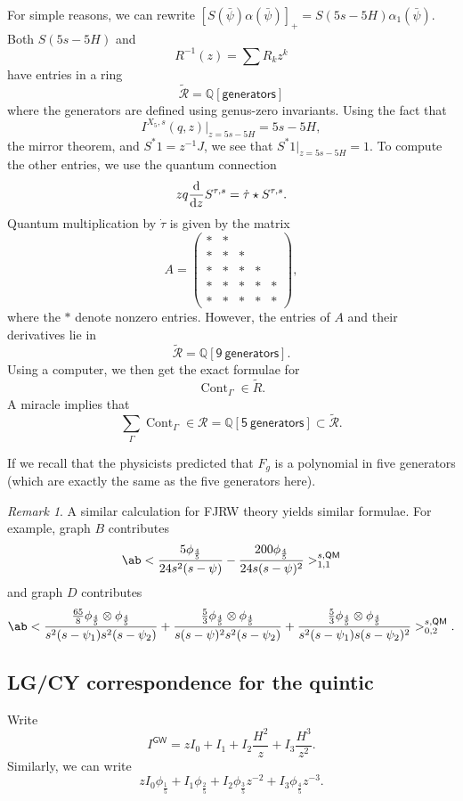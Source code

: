 \documentclass[10pt,oldfontcommands,oneside]{memoir}
\theoremstyle{definition}
\theoremstyle{remark}
\newtheorem{rmk}[thm]{Remark}
\theoremstyle{plain}
\theoremstyle{definition}
\theoremstyle{remark}
\newcommand{\Q}{\mathbb{Q}}
\newcommand{\mc}[1]{\mathcal{#1}}
\newcommand{\ms}[1]{\mathsf{#1}}
\newcommand{\1}{\mathbf{1}}
\newcommand{\2}{\mathbf{2}}
\newcommand{\3}{\mathbf{3}}
\newcommand{\GW}{\ms{GW}}
\newcommand{\QM}{\ms{QM}}
\DeclareMathOperator{\Cont}{Cont}
\begin{document}
For simple reasons, we can rewrite $[S(\bar{\psi})\alpha(\bar{\psi})]_+ = S(5s-5H) \alpha_1(\bar{\psi})$. Both $S(5s-5H)$ and
\[ R^{-1}(z) = \sum R_k z^k \]
have entries in a ring
\[ \tilde{\mc{R}} = \Q[\ms{generators}] \]
where the generators are defined using genus-zero invariants. Using the fact that
\[ I^{X_5,s}(q,z)|_{z = 5s-5H} = 5s-5H, \]
the mirror theorem, and $S^* 1 = z^{-1}J$, we see that $S^* 1 |_{z=5s-5H} = 1$. To compute the other entries, we use the quantum connection
\[ z q \odv{}{z}S^{\tau,s} = \dot{\tau} \star S^{\tau,s}. \]
Quantum multiplication by $\dot{\tau}$ is given by the matrix
\[ A = \begin{pmatrix}
    * & * \\
    * & * & * \\
    * & * & * & * \\
    * & * & * & * & * \\
    * & * & * & * & * 
\end{pmatrix}, \]
where the $*$ denote nonzero entries. However, the entries of $A$ and their derivatives lie in 
\[ \tilde{\mc{R}} = \Q[\ms{9\ generators}]. \]
Using a computer, we then get the exact formulae for
\[ \Cont_{\Gamma} \in \tilde{R}. \]
A miracle implies that
\[ \sum_{\Gamma} \Cont_{\Gamma} \in \mc{R} = \Q[\ms{5\ generators}] \subset \tilde{\mc{R}}. \]

If we recall that the physicists predicted that $F_g$ is a polynomial in five generators (which are exactly the same as the five generators here).

\begin{rmk}
    A similar calculation for FJRW theory yields similar formulae. For example, graph $B$ contributes
    \[ \ab<\frac{5 \phi_{\frac{4}{5}}}{24s^2(s-\psi)} - \frac{200 \phi_{\frac{4}{5}}}{24s(s-\psi)^2}>_{1,1}^{s,\QM} \]
    and graph $D$ contributes
    \[ \ab<\frac{\frac{65}{8} \phi_{\frac{4}{5}} \otimes \phi_{\frac{4}{5}}}{s^2(s-\psi_1)s^2(s-\psi_2)} + \frac{\frac{5}{3} \phi_{\frac{4}{5}} \otimes \phi_{\frac{4}{5}}}{s(s-\psi)^2 s^2 (s-\psi_2)} + \frac{\frac{5}{3} \phi_{\frac{4}{5}} \otimes \phi_{\frac{4}{5}}}{s^2(s-\psi_1)s(s-\psi_2)^2}>_{0,2}^{s,\QM}. \]
\end{rmk}

\subsection{LG/CY correspondence for the quintic}%
\label{sub:LG/CY correspondence for the quintic}

Write
\[ I^{\GW} = z I_0 + I_1 + I_2 \frac{H^2}{z} + I_3 \frac{H^3}{z^2}. \]
Similarly, we can write
\[ z I_0 \phi_{\frac{1}{5}} + I_1 \phi_{\frac{2}{5}} + I_2 \phi_{\frac{3}{5}} z^{-2} + I_3 \phi_{\frac{4}{5}} z^{-3}. \]
\end{document}
